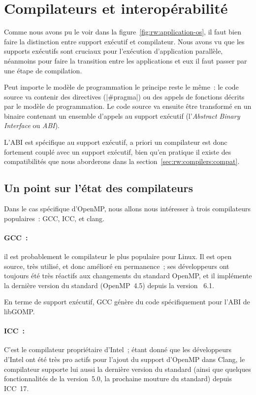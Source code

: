 \section{Compilateurs et interopérabilité}\label{sec:rw:compilers}

Comme nous avons pu le voir dans la figure~\ref{fig:rw:application-os}, il faut bien faire la distinction entre support exécutif et compilateur.
Nous avons vu que les supports exécutifs sont cruciaux pour l'exécution d'application parallèle, néanmoins pour faire la transition entre les applications et eux il faut passer par une étape de compilation.

Peut importe le modèle de programmation le principe reste le même~: le code source va contenir des directives (|#pragma|) ou des appels de fonctions décrits par le modèle de programmation. Le code source va ensuite être transformé en un binaire contenant un ensemble d'appels au support exécutif (l'\emph{Abstract Binary Interface} ou \emph{ABI}).

L'ABI est spécifique au support exécutif, a priori un compilateur est donc fortement couplé avec un support exécutif, bien qu'en pratique il existe des compatibilités que nous aborderons dans la section~\ref{sec:rw:compilers:compat}.



\subsection{Un point sur l'état des compilateurs}\label{sec:rw:compilers:desc}

Dans le cas spécifique d'OpenMP, nous allons nous intéresser à trois compilateurs populaires~: GCC, ICC, et clang.

\paragraph{GCC~:}
il est probablement le compilateur le plus populaire pour Linux.
Il est open source, très utilisé, et donc amélioré en permanence~; ses développeurs ont toujours été très réactifs aux changements du standard OpenMP, et il implémente la dernière version du standard (OpenMP~4.5) depuis la version ~6.1.

En terme de support exécutif, GCC génère du code spécifiquement pour l'ABI de libGOMP.



\paragraph{ICC~:}
C'est le compilateur propriétaire d'Intel~; étant donné que les développeurs d'Intel ont été très pro actifs pour l'ajout du support d'OpenMP dans Clang, le compilateur supporte lui aussi la dernière version du standard (ainsi que quelques fonctionnalités de la version~5.0, la prochaine mouture du standard) depuis ICC~17.

